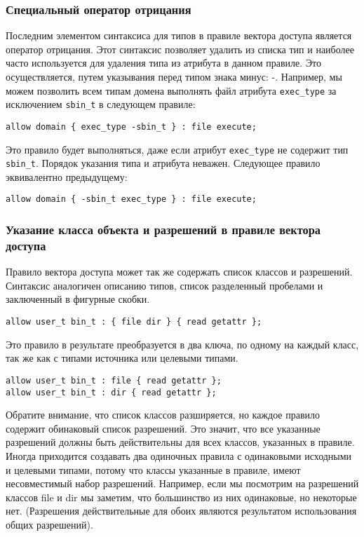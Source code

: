 \documentclass{./../class/UIR}
\begin{document}
\subsubsection{Специальный оператор отрицания}
    Последним элементом синтаксиса для типов в правиле вектора доступа является
    оператор отрицания. Этот синтаксис позволяет удалить из списка тип и
    наиболее часто используется для удаления типа из атрибута в данном правиле.
    Это осуществляется, путем указывания перед типом знака минус: -. Например,
    мы можем позволить всем типам домена выполнять файл атрибута
    \verb"exec_type" за исключением \verb"sbin_t" в следующем правиле:
\begin{verbatim}
allow domain { exec_type -sbin_t } : file execute;
\end{verbatim}
    Это правило будет выполняться, даже если атрибут \verb"exec_type" не
    содержит тип \verb"sbin_t".
    Порядок указания типа и атрибута неважен. Следующее правило эквивалентно
    предыдущему:
\begin{verbatim}
allow domain { -sbin_t exec_type } : file execute;
\end{verbatim}
\subsubsection{Указание класса объекта и разрешений в правиле вектора доступа}
    Правило вектора доступа может так же содержать список классов и разрешений.
    Синтаксис аналогичен описанию типов, список разделенный пробелами и
    заключенный в фигурные скобки.
\begin{verbatim}
allow user_t bin_t : { file dir } { read getattr };
\end{verbatim}
    Это правило в результате преобразуется в два ключа, по одному на каждый
    класс, так же как с типами источника или целевыми типами.
\begin{verbatim}
allow user_t bin_t : file { read getattr };
allow user_t bin_t : dir { read getattr };
\end{verbatim}
    Обратите внимание, что список классов разширяется, но каждое правило
    содержит обинаковый список разрешений. Это значит, что все указанные
    разрешений должны быть действительны для всех классов, указанных в правиле.
    Иногда приходится создавать два одиночных правила с одинаковыми исходными и
    целевыми типами, потому что классы указанные в правиле, имеют несовместимый
    набор разрешений. Например, если мы посмотрим на разрешений классов file и
    dir мы заметим, что большинство из них одинаковые, но некоторые нет.
    (Разрешения действительные для обоих являются результатом использования
    общих разрешений).
\end{document}
